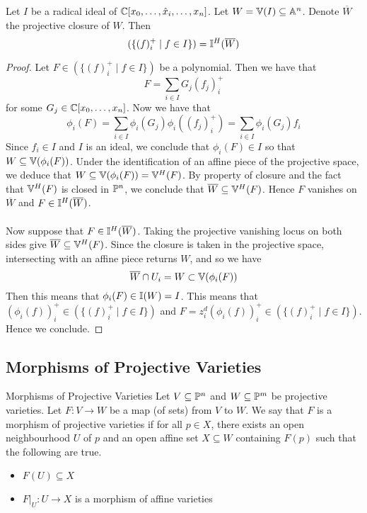 \documentclass[a4paper]{article}
\begin{document}
\begin{prp}{}{} Let $I$ be a radical ideal of $\mathbb{C}[x_0,\dots,\hat{x}_i,\dots,x_n]$. Let $W=\mathbb{V}(I)\subseteq\mathbb{A}^n$. Denote $\overline{W}$ the projective closure of $W$. Then $$(\{(f)_i^+\;|\;f\in I\})=\mathbb{I}^H(\overline{W})$$ \tcbline
\begin{proof}
Let $F\in(\{(f)_i^+\;|\;f\in I\})$ be a polynomial. Then we have that $$F=\sum_{i\in I} G_j(f_j)_i^+$$ for some $G_j\in\mathbb{C}[x_0,\dots,x_n]$. Now we have that $$\phi_i(F)=\sum_{i\in I}\phi_i(G_j)\phi_i((f_j)_i^+)=\sum_{i\in I}\phi_i(G_j)f_i$$ Since $f_i\in I$ and $I$ is an ideal, we conclude that $\phi_i(F)\in I$ so that $W\subseteq\mathbb{V}(\phi_i(F))$. Under the identification of an affine piece of the projective space, we deduce that $W\subseteq\mathbb{V}(\phi_i(F))=\mathbb{V}^H(F)$. By property of closure and the fact that $\mathbb{V}^H(F)$ is closed in $\mathbb{P}^n$, we conclude that $\overline{W}\subseteq\mathbb{V}^H(F)$. Hence $F$ vanishes on $\overline{W}$ and $F\in\mathbb{I}^H(\overline{W})$. \\~\\

Now suppose that $F\in\mathbb{I}^H(\overline{W})$. Taking the projective vanishing locus on both sides give $\overline{W}\subseteq\mathbb{V}^H(F)$. Since the closure is taken in the projective space, intersecting with an affine piece returns $W$, and so we have $$\overline{W}\cap U_i=W\subset\mathbb{V}(\phi_i(F))$$ Then this means that $\phi_i(F)\in\mathbb{I}(W)=I$. This means that $(\phi_i(f))_i^+\in(\{(f)_i^+\;|\;f\in I\})$ and $F=z_i^d(\phi_i(f))_i^+\in(\{(f)_i^+\;|\;f\in I\})$. Hence we conclude. 
\end{proof}
\end{prp}

\subsection{Morphisms of Projective Varieties}
\begin{defn}{Morphisms of Projective Varieties}{} Let $V\subseteq\mathbb{P}^n$ and $W\subseteq\mathbb{P}^m$ be projective varieties. Let $F:V\to W$ be a map (of sets) from $V$ to $W$. We say that $F$ is a morphism of projective varieties if for all $p\in X$, there exists an open neighbourhood $U$ of $p$ and an open affine set $X\subseteq W$ containing $F(p)$ such that the following are true. 
\begin{itemize}
\item $F(U)\subseteq X$
\item $F|_U:U\to X$ is a morphism of affine varieties
\end{itemize}
\end{defn}
\end{document}
